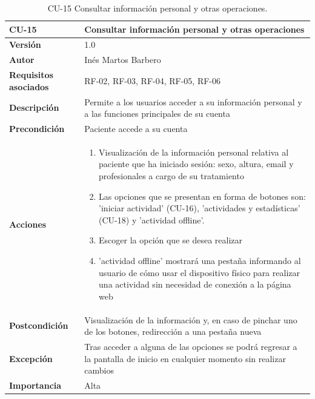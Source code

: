 \begin{table}[p]
	\centering
	\begin{tabularx}{\linewidth}{ p{} p{} }
		\toprule
		\textbf{CU-15}    & \textbf{Consultar información personal y otras operaciones}\\
		\toprule
		\textbf{Versión}              & 1.0    \\
		\textbf{Autor}                & Inés Martos Barbero \\
		\textbf{Requisitos asociados} & RF-02, RF-03, RF-04, RF-05, RF-06 \\
		\textbf{Descripción}          & Permite a los usuarios acceder a su información personal y a las funciones principales de su cuenta \\
		\textbf{Precondición}         & Paciente accede a su cuenta \\
		\textbf{Acciones}             &
		\begin{enumerate}
			\def\labelenumi{\arabic{enumi}.}
			\tightlist
			\item Visualización de la información personal relativa al paciente que ha iniciado sesión: sexo, altura, email y profesionales a cargo de su tratamiento
			\item Las opciones que se presentan en forma de botones son: 'iniciar actividad' (CU-16), 'actividades y estadísticas' (CU-18) y 'actividad offline'.
            \item Escoger la opción que se desea realizar
            \item 'actividad offline' mostrará una pestaña informando al usuario de cómo usar el dispositivo físico para realizar una actividad sin necesidad de conexión a la página web
		\end{enumerate}\\
		\textbf{Postcondición}        & Visualización de la información y, en caso de pinchar uno de los botones, redirección a una pestaña nueva \\
		\textbf{Excepción}          & Tras acceder a alguna de las opciones se podrá regresar a la pantalla de inicio en cualquier momento sin realizar cambios \\
		\textbf{Importancia}          & Alta \\
		\bottomrule
	\end{tabularx}
	\caption{CU-15 Consultar información personal y otras operaciones.}
\end{table}

